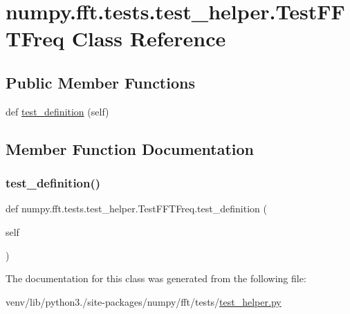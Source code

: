 \hypertarget{classnumpy_1_1fft_1_1tests_1_1test__helper_1_1TestFFTFreq}{}\section{numpy.\+fft.\+tests.\+test\+\_\+helper.\+Test\+F\+F\+T\+Freq Class Reference}
\label{classnumpy_1_1fft_1_1tests_1_1test__helper_1_1TestFFTFreq}
\subsection*{Public Member Functions}
\begin{DoxyCompactItemize}
\item 
def \hyperlink{classnumpy_1_1fft_1_1tests_1_1test__helper_1_1TestFFTFreq_a462bf89204d7b015d3ecd6b776d54245}{test\+\_\+definition} (self)
\end{DoxyCompactItemize}


\subsection{Member Function Documentation}
\mbox{\label{classnumpy_1_1fft_1_1tests_1_1test__helper_1_1TestFFTFreq_a462bf89204d7b015d3ecd6b776d54245}} 
\subsubsection{\texorpdfstring{test\+\_\+definition()}{test\_definition()}}
{\footnotesize\ttfamily def numpy.\+fft.\+tests.\+test\+\_\+helper.\+Test\+F\+F\+T\+Freq.\+test\+\_\+definition (\begin{DoxyParamCaption}\item[{}]{self }\end{DoxyParamCaption})}



The documentation for this class was generated from the following file\+:\begin{DoxyCompactItemize}
\item 
venv/lib/python3./site-\/packages/numpy/fft/tests/\hyperlink{test__helper_8py}{test\+\_\+helper.\+py}\end{DoxyCompactItemize}
